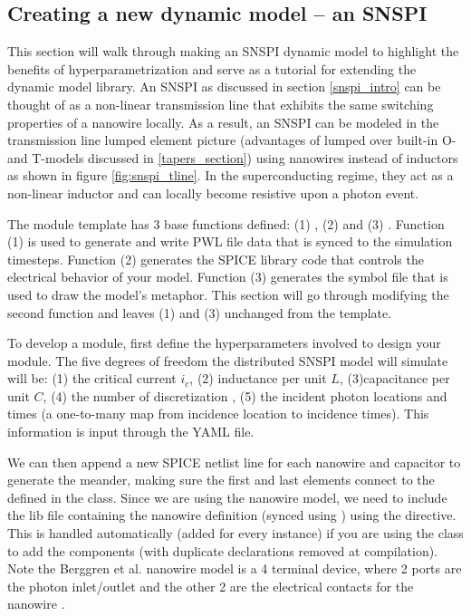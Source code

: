 
\subsection{Creating a new dynamic model -- an SNSPI} \label{snspi_dyn_model}

This section will walk through making an SNSPI dynamic model to highlight the benefits
of hyperparametrization and serve as a tutorial for extending the  dynamic model library. 
An SNSPI as discussed in section \ref{snspi_intro} can be thought
of as a non-linear transmission line that exhibits the same switching properties of a nanowire
locally. As a result, an SNSPI can be modeled in the transmission line lumped element picture
(advantages of lumped over built-in O- and T-models discussed in \ref{tapers_section})
using nanowires instead of inductors as shown in figure
\ref{fig:snspi_tline}. In the superconducting regime, they act as a non-linear
inductor and can locally become resistive upon a photon event.

\begin{sloppypar}
The  module template has 3 base functions defined: (1) ,
(2)  and (3) . Function (1) is used to generate 
and write PWL file data that is synced to the simulation timesteps. Function (2)
generates the SPICE library code that controls the electrical behavior of your model.
Function (3) generates the symbol file that is used to draw the model's metaphor. This
section will go through modifying the second function and leaves (1) and (3) unchanged
from the template.
\end{sloppypar}

To develop a module, first define the hyperparameters involved to design your module.
The five degrees of freedom the distributed SNSPI model will simulate will be: (1) the
critical current $i_c$, (2) inductance per unit $L$, (3)capacitance per unit $C$, 
(4) the number of discretization
, (5) the incident photon locations and times (a one-to-many map from incidence 
location to incidence times). This information is input through the YAML file.

We can then append a new SPICE netlist line for each nanowire and capacitor to generate the
meander, making sure the first and last elements connect to the  defined in the 
class. Since we are using the nanowire model, we need to include the lib file containing
the nanowire definition (synced using ) using the  directive. This is
handled automatically (added for every instance) if you are using the  
class to add the components
(with duplicate declarations removed at compilation).
Note the
Berggren et al. nanowire model is a 4 terminal device, where 2 ports are the photon inlet/outlet
and the other 2 are the electrical contacts for the nanowire \cite{karl_spice}. 

